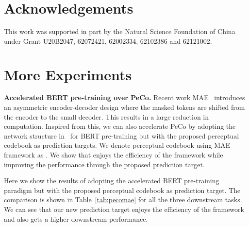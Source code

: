 \documentclass[letterpaper]{article} \usepackage{aaai23}  \usepackage{times}  \usepackage{helvet}  \usepackage{courier}  \usepackage[hyphens]{url}  \usepackage{graphicx} \urlstyle{rm} \def\UrlFont{\rm}  \usepackage{natbib}  \usepackage{caption} \frenchspacing  \setlength{\pdfpagewidth}{8.5in}  \setlength{\pdfpageheight}{11in}  \usepackage{algorithm}
\begin{document}
\section*{Acknowledgements} 
This work was supported in part by the Natural Science Foundation of China
under Grant  U20B2047, 62072421, 62002334, 62102386 and 62121002.


\clearpage
\appendix
\section{More Experiments}

\noindent \textbf{Accelerated BERT pre-training over PeCo.}
Recent work MAE~\cite{he2021masked} introduces an asymmetric encoder-decoder design where the masked tokens are shifted from the encoder to the small decoder. This results in a large reduction in computation.
Inspired from this, we can also accelerate PeCo by adopting the network structure in~\cite{he2021masked} for BERT pre-training but with the proposed perceptual codebook as prediction targets.
We denote perceptual codebook using MAE framework as .
We show that  enjoys the efficiency of the framework while improving the performance through the proposed prediction target.

Here we show the results of adopting the accelerated BERT pre-training paradigm but with the proposed perceptual codebook as prediction target.
The comparison is shown in Table~\ref{tab:pecomae} for all the three downstream tasks.
We can see that our new prediction target enjoys the efficiency of the framework and also gets a higher downstream performance.


\begin{table}[h]
\centering
\small
{}
\caption{The effect of PeCo using accelerated BERT pre-training compared on (a) image classification, (b) semantic segmentation, and (c) object detection and instance segmentation.}
\label{tab:pecomae}
\end{table}
\end{document}
